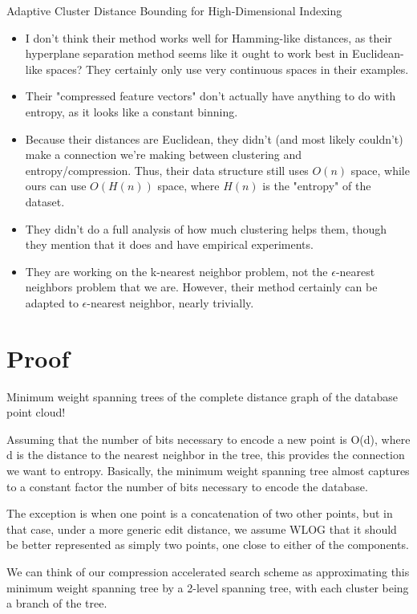 \documentclass{amsart}
\theoremstyle{definition}
\theoremstyle{remark}
\numberwithin{equation}{section}
\begin{document}
Adaptive Cluster Distance Bounding for High-Dimensional Indexing \cite{ramaswamy2011adaptive}
\begin{itemize}
\item I don't think their method works well for Hamming-like distances, as
   their hyperplane separation method seems like it ought to work best
   in Euclidean-like spaces? They certainly only use very continuous
   spaces in their examples.
\item Their "compressed feature vectors" don't actually have anything to do
   with entropy, as it looks like a constant binning.
\item Because their distances are Euclidean, they didn't (and most likely
   couldn't) make a connection we're making between clustering and
   entropy/compression. Thus, their data structure still uses $O(n)$
   space, while ours can use $O(H(n))$ space, where $H(n)$ is the "entropy"
   of the dataset.
\item They didn't do a full analysis of how much clustering helps them,
   though they mention that it does and have empirical experiments.
\item They are working on the k-nearest neighbor problem, not the
   $\epsilon$-nearest neighbors problem that we are. However, their method
   certainly can be adapted to $\epsilon$-nearest neighbor, nearly
   trivially.
\end{itemize}

\section{Proof}
Minimum weight spanning trees of the complete distance graph of the
database point cloud!

Assuming that the number of bits necessary to encode a new point is
O(d), where d is the distance to the nearest neighbor in the tree, this
provides the connection we want to entropy. Basically, the minimum
weight spanning tree almost captures to a constant factor the number of
bits necessary to encode the database.

The exception is when one point is a concatenation of two other points,
but in that case, under a more generic edit distance, we assume WLOG
that it should be better represented as simply two points, one close to
either of the components.

We can think of our compression accelerated search scheme as
approximating this minimum weight spanning tree by a 2-level spanning
tree, with each cluster being a branch of the tree.
\end{document}
